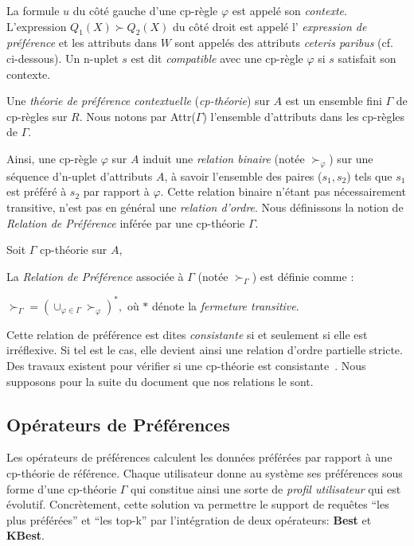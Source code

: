 La formule $u$ du côté gauche d'une cp-règle $\varphi$ est appelé son \textit{contexte}. L'expression $Q_1(X) \succ Q_2(X)$ du côté droit est appelé l' \textit{expression de préférence} et les attributs dans $W$ sont appelés des attributs \textit{ceteris paribus} (cf. ci-dessous). Un n-uplet $s$ est dit \textit{compatible} avec une cp-règle $\varphi$ si $s$ satisfait son contexte.

Une \textit{théorie de préférence contextuelle} (\textit{cp-théorie}) sur $A$ est un ensemble fini $\Gamma$ de cp-règles sur $R$. Nous notons par Attr($\Gamma$) l'ensemble d'attributs dans les cp-règles de $\Gamma$.

Ainsi, une cp-règle $\varphi$ sur $A$ induit une \textit{relation binaire} (notée $\succ_\varphi$) sur une séquence d'n-uplet d'attributs $A$, à savoir l'ensemble des paires ($s_1,s_2$) tels que $s_1$ est préféré à $s_2$ par rapport à $\varphi$. Cette relation binaire n'étant pas nécessairement transitive, n'est pas en général une \textit{relation d'ordre}. Nous définissons la notion de \textit{Relation de Préférence} inférée par une cp-théorie $\Gamma$.

\begin{defi}
Soit $\Gamma$ cp-théorie sur $A$,

La \textit{Relation de Préférence} associée à $\Gamma$ (notée $\succ_\Gamma$) est définie comme :
\begin{center} $\succ_\Gamma = (\cup_{\varphi \in \Gamma} \succ_\varphi)^*,$ o\`u $*$ dénote la \textit{fermeture transitive}.\end{center}
\end{defi}

Cette relation de préférence est dites \textit{consistante} si et seulement si elle est irréflexive. Si tel est le cas, elle devient ainsi une relation d'ordre partielle stricte. Des travaux existent pour vérifier si une cp-théorie est consistante~\cite{Wilson:cpnet}. Nous supposons pour la suite du document que nos relations le sont.

\subsection{Opérateurs de Préférences}
Les opérateurs de préférences calculent les données préférées par rapport à une cp-th\'eorie de référence. Chaque utilisateur donne au système ses préférences sous forme d'une cp-th\'eorie $\Gamma$ qui constitue ainsi une sorte de \textit{profil utilisateur} qui est évolutif. Concrètement, cette solution va permettre le support de requêtes 
\enquote{les plus préférées} et \enquote{les top-k} par l'intégration de deux opérateurs: \textbf{Best} et \textbf{KBest}.

